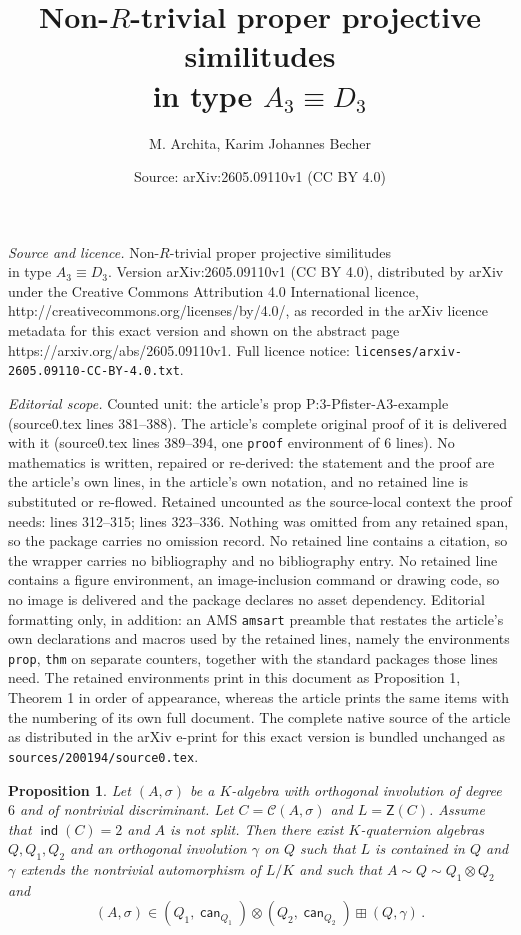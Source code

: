 \documentclass[10pt,a4paper]{amsart}
\title{Non-$R$-trivial proper projective similitudes\\ in type $A_3\equiv D_3$}
\author{M. Archita, Karim Johannes Becher}
\date{Source: arXiv:2605.09110v1 (CC BY 4.0)}
\newtheorem{prop}{Proposition}
\newcommand{\Cl}{\mc{C}}
\newcommand{\Z}{\mathsf{Z}}
\newcommand{\can}{\operatorname{\mathsf{can}}}
\newcommand\ind{\operatorname{\mathsf{ind}}}
\newcommand{\mc}{\mathcal}
\newcommand{\s}{\sigma}
\begin{document}
\maketitle

\noindent\emph{Source and licence.} Non-$R$-trivial proper projective similitudes\\ in type $A_3\equiv D_3$. Version arXiv:2605.09110v1 (CC BY 4.0), distributed by arXiv under the Creative Commons Attribution 4.0 International licence, http://creativecommons.org/licenses/by/4.0/, as recorded in the arXiv licence metadata for this exact version and shown on the abstract page https://arxiv.org/abs/2605.09110v1. Full licence notice: \texttt{licenses/arxiv-2605.09110-CC-BY-4.0.txt}.\par\smallskip

\noindent\textit{Editorial scope.} Counted unit: the article's prop P:3-Pfister-A3-example (source0.tex lines 381--388). The article's complete original proof of it is delivered with it (source0.tex lines 389--394, one \texttt{proof} environment of 6 lines). No mathematics is written, repaired or re-derived: the statement and the proof are the article's own lines, in the article's own notation, and no retained line is substituted or re-flowed.  Retained uncounted as the source-local context the proof needs: lines 312--315; lines 323--336.  Nothing was omitted from any retained span, so the package carries no omission record.  No retained line contains a citation, so the wrapper carries no bibliography and no bibliography entry.  No retained line contains a figure environment, an image-inclusion command or drawing code, so no image is delivered and the package declares no asset dependency.  Editorial formatting only, in addition: an AMS \texttt{amsart} preamble that restates the article's own declarations and macros used by the retained lines, namely the environments \texttt{prop}, \texttt{thm} on separate counters, together with the standard packages those lines need.  The retained environments print in this document as Proposition 1, Theorem 1 in order of appearance, whereas the article prints the same items with the numbering of its own full document.  The complete native source of the article as distributed in the arXiv e-print for this exact version is bundled unchanged as \texttt{sources/200194/source0.tex}.
\begin{prop}\label{D3-ex-construction}
Let $(A,\s)$ be a $K$-algebra with orthogonal involution of degree $6$ and of nontrivial discriminant. Let $C=\Cl(A,\s)$ and $L=\Z(C)$. Assume that $\ind(C)=2$ and $A$ is not split. 
Then there exist $K$-quaternion algebras $Q,Q_1,Q_2$ and an orthogonal involution $\gamma$ on $Q$ such that $L$ is contained in $Q$ and $\gamma$ extends the nontrivial automorphism of $L/K$ and such that $A\sim Q\sim Q_1\otimes Q_2$ and $$(A,\s) \in (Q_1,\can_{Q_1})\otimes (Q_2,\can_{Q_2}) \boxplus (Q,\gamma)\,.$$
\end{prop}
\end{document}
